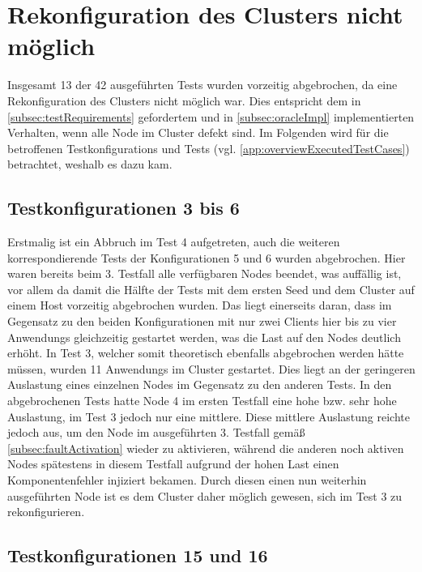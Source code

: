 \section{Rekonfiguration des Clusters nicht möglich}
\label{sec:noReconfig}

Insgesamt 13 der 42 ausgeführten \glspl{Test} wurden vorzeitig abgebrochen, da eine Rekonfiguration des Clusters nicht möglich war.
Dies entspricht dem in \cref{subsec:testRequirements} gefordertem und in \cref{subsec:oracleImpl} implementierten Verhalten, wenn alle Node im Cluster defekt sind.
Im Folgenden wird für die betroffenen \glspl{Testkonfiguration} und \glspl{Test} (vgl. \cref{app:overviewExecutedTestCases}) betrachtet, weshalb es dazu kam.

\subsection{Testkonfigurationen 3 bis 6}
\label{subsec:noReconf36}

Erstmalig ist ein Abbruch im \gls{Test} 4 aufgetreten, auch die weiteren korrespondierende \glspl{Test} der Konfigurationen 5 und 6 wurden abgebrochen.
Hier waren bereits beim 3. \gls{Testfall} alle verfügbaren Nodes beendet, was auffällig ist, vor allem da damit die Hälfte der \glspl{Test} mit dem ersten Seed und dem Cluster auf einem Host vorzeitig abgebrochen wurden.
Das liegt einerseits daran, dass im Gegensatz zu den beiden Konfigurationen mit nur zwei Clients hier bis zu vier \glspl{Anwendung} gleichzeitig gestartet werden, was die Last auf den Nodes deutlich erhöht.
In \gls{Test} 3, welcher somit theoretisch ebenfalls abgebrochen werden hätte müssen, wurden 11 \glspl{Anwendung} im Cluster gestartet.
Dies liegt an der geringeren Auslastung eines einzelnen Nodes im Gegensatz zu den anderen Tests.
In den abgebrochenen \glspl{Test} hatte Node 4 im ersten \gls{Testfall} eine hohe bzw. sehr hohe Auslastung, im \gls{Test} 3 jedoch nur eine mittlere.
Diese mittlere Auslastung reichte jedoch aus, um den Node im ausgeführten 3. \gls{Testfall} gemäß \cref{subsec:faultActivation} wieder zu aktivieren, während die anderen noch aktiven Nodes spätestens in diesem \gls{Testfall} aufgrund der hohen Last einen Komponentenfehler injiziert bekamen.
Durch diesen einen nun weiterhin ausgeführten Node ist es dem Cluster daher möglich gewesen, sich im \gls{Test} 3 zu rekonfigurieren.

\subsection{Testkonfigurationen 15 und 16}
\label{subsec:noReconf1516}

